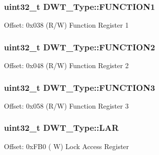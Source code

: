 \subsubsection[{\texorpdfstring{F\+U\+N\+C\+T\+I\+O\+N1}{FUNCTION1}}]{ uint32\+\_\+t D\+W\+T\+\_\+\+Type\+::\+F\+U\+N\+C\+T\+I\+O\+N1}\hypertarget{structDWT__Type_a3345a33476ee58e165447a3212e6d747}{}\label{structDWT__Type_a3345a33476ee58e165447a3212e6d747}
Offset\+: 0x038 (R/W) Function Register 1 
\subsubsection[{\texorpdfstring{F\+U\+N\+C\+T\+I\+O\+N2}{FUNCTION2}}]{ uint32\+\_\+t D\+W\+T\+\_\+\+Type\+::\+F\+U\+N\+C\+T\+I\+O\+N2}\hypertarget{structDWT__Type_acba1654190641a3617fcc558b5e3f87b}{}\label{structDWT__Type_acba1654190641a3617fcc558b5e3f87b}
Offset\+: 0x048 (R/W) Function Register 2 
\subsubsection[{\texorpdfstring{F\+U\+N\+C\+T\+I\+O\+N3}{FUNCTION3}}]{ uint32\+\_\+t D\+W\+T\+\_\+\+Type\+::\+F\+U\+N\+C\+T\+I\+O\+N3}\hypertarget{structDWT__Type_a80bd242fc05ca80f9db681ce4d82e890}{}\label{structDWT__Type_a80bd242fc05ca80f9db681ce4d82e890}
Offset\+: 0x058 (R/W) Function Register 3 
\subsubsection[{\texorpdfstring{L\+AR}{LAR}}]{ uint32\+\_\+t D\+W\+T\+\_\+\+Type\+::\+L\+AR}\hypertarget{structDWT__Type_a0e69531f29f71c62cccac82417cda0f8}{}\label{structDWT__Type_a0e69531f29f71c62cccac82417cda0f8}
Offset\+: 0x\+F\+B0 ( W) Lock Access Register 
